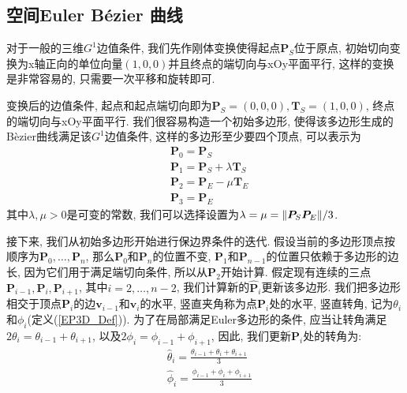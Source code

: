 \documentclass[utf8]{ctexart} %
\numberwithin{figure}{section}
\numberwithin{equation}{section}
\begin{document}
	 \subsection{空间Euler B\'{e}zier 曲线}
	 对于一般的三维$G^1$边值条件, 我们先作刚体变换使得起点$\boldsymbol{P}_S$位于原点, 初始切向变换为x轴正向的单位向量$(1,0,0)$并且终点的端切向与xOy平面平行, 这样的变换是非常容易的, 只需要一次平移和旋转即可. \par
	 变换后的边值条件, 起点和起点端切向即为$\boldsymbol{P}_S=(0,0,0), \boldsymbol{T}_S = (1,0,0)$, 终点的端切向与xOy平面平行. 我们很容易构造一个初始多边形, 使得该多边形生成的B\`ezier曲线满足该$G^1$边值条件, 这样的多边形至少要四个顶点, 可以表示为
	 \begin{equation}
	 	\begin{aligned}
	 		&\boldsymbol{P}_0 = \boldsymbol{P}_S\\
	 		&\boldsymbol{P}_1 = \boldsymbol{P}_S+\lambda\boldsymbol{T}_S\\
	 		&\boldsymbol{P}_2 = \boldsymbol{P}_E-\mu\boldsymbol{T}_E\\
	 		&\boldsymbol{P}_3 = \boldsymbol{P}_E
	 	\end{aligned}
	 \end{equation}
	 其中$\lambda, \mu>0$是可变的常数, 我们可以选择设置为$\lambda = \mu = \Arrowvert\boldsymbol{P}_S\boldsymbol{P}_E\Arrowvert/3$. \par 
	 接下来, 我们从初始多边形开始进行保边界条件的迭代. 假设当前的多边形顶点按顺序为$\boldsymbol{P}_0, \dots,\boldsymbol{P}_n$, 那么$\boldsymbol{P}_0$和$\boldsymbol{P}_n$的位置不变, $\boldsymbol{P}_1$和$\boldsymbol{P}_{n-1}$的位置只依赖于多边形的边长, 因为它们用于满足端切向条件, 所以从$\boldsymbol{P}_2$开始计算. 假定现有连续的三点$\boldsymbol{P}_{i-1},\boldsymbol{P}_i,\boldsymbol{P}_{i+1}$, 其中$i=2,\dots,n-2$, 我们计算新的$\hat{\boldsymbol{P}}_i$更新该多边形. 我们把多边形相交于顶点$\boldsymbol{P}_i$的边$\boldsymbol{v}_{i-1}$和$\boldsymbol{v}_{i}$的水平, 竖直夹角称为点$\boldsymbol{P}_i$处的水平, 竖直转角, 记为$\theta_i$和$\phi_i$(定义(\ref{EP3D_Def})). 为了在局部满足Euler多边形的条件, 应当让转角满足$2\theta_i = \theta_{i-1}+\theta_{i+1}$, 以及$2\phi_{i} = \phi_{i-1}+\phi_{i+1}$, 因此, 我们更新$\boldsymbol{P}_i$处的转角为:
	 \begin{equation}\label{new_theta}
	 	\begin{aligned}
	 		&\hat{\theta}_i = \frac{\theta_{i-1}+\theta_i+\theta_{i+1}}3\\
	 		&\hat{\phi}_i =
	 		\frac{\phi_{i-1}+\phi_i+\phi_{i+1}}3
	 	\end{aligned}
	 \end{equation}
\end{document}
